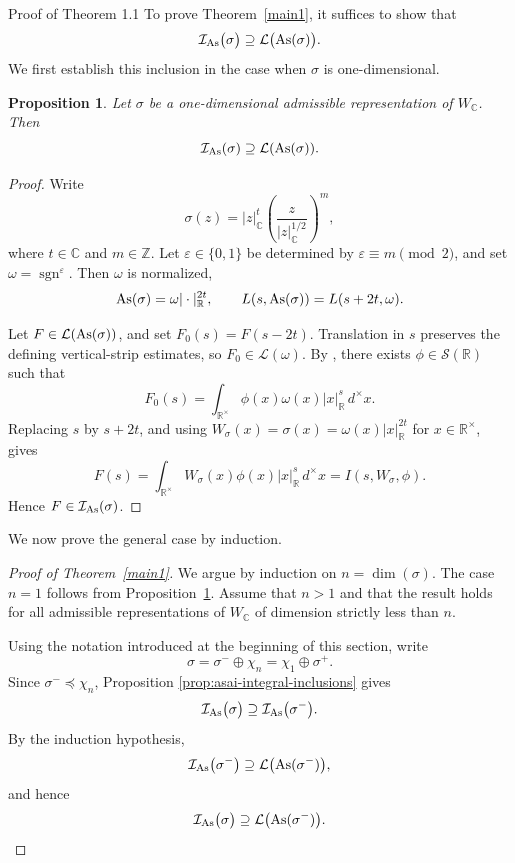 \documentclass[12pt,reqno]{amsart}
\numberwithin{equation}{section}%
\numberwithin{equation}{subsection}
\newtheorem{prop}[equation]{Proposition}
\theoremstyle{definition}
\theoremstyle{remark}
\begin{document}
\begin{section}{Proof of Theorem 1.1}
To prove Theorem~\ref{main1}, it suffices to show that
\[
\mathcal{I}_{\rm As}\bigl(\sigma\bigr)
\supseteq
\mathcal{L}\bigl({\rm As}(\sigma)\bigr).
\]
We first establish this inclusion in the case when $\sigma$ is one-dimensional.

\begin{prop}
\label{prop:asai-rank-one}
Let $\sigma$ be a one-dimensional admissible representation of
$W_{\mathbb C}$. Then
\[
\mathcal{I}_{\rm As}(\sigma)
\supseteq
\mathcal{L}({\rm As}(\sigma)).
\]
\end{prop}

\begin{proof}
Write
\[
\sigma(z)
=
|z|_{\mathbb C}^{t}
\left(
\frac{z}{|z|_{\mathbb C}^{1/2}}
\right)^{m},
\] where \(t\in\mathbb C\) and \(m\in\mathbb Z\). Let
\(\varepsilon\in\{0,1\}\) be determined by
\(\varepsilon\equiv m\pmod 2\), and set
\(\omega=\operatorname{sgn}^{\varepsilon}\). Then \(\omega\) is
normalized,
\[
{\rm As}(\sigma)=\omega|\cdot|_{\mathbb R}^{2t},
\qquad
L(s,{\rm As}(\sigma))=L(s+2t,\omega).
\]

Let \(F\in\mathcal{L}({\rm As}(\sigma))\), and set
\(F_0(s)=F(s-2t)\). Translation in \(s\) preserves the defining
vertical-strip estimates, so \(F_0\in\mathcal{L}(\omega)\). By
\cite[Lemma~12.3]{Jac2009}, there exists
\(\phi\in\mathcal{S}(\mathbb R)\) such that
\[
F_0(s)
=
\int_{\mathbb R^\times}
\phi(x)\omega(x)|x|_{\mathbb R}^{s}\,d^\times x.
\]
Replacing \(s\) by \(s+2t\), and using
\(W_\sigma(x)=\sigma(x)=\omega(x)|x|_{\mathbb R}^{2t}\) for
\(x\in\mathbb R^\times\), gives
\[
F(s)
=
\int_{\mathbb R^\times}
W_\sigma(x)\phi(x)|x|_{\mathbb R}^{s}\,d^\times x
=
I(s,W_\sigma,\phi).
\]
Hence \(F\in\mathcal{I}_{{\rm As}}(\sigma)\).
\end{proof}

We now prove the general case by induction.

\begin{proof}[Proof of Theorem~\ref{main1}]
We argue by induction on $n=\dim(\sigma)$. The case $n=1$ follows from
Proposition~\ref{prop:asai-rank-one}. Assume that $n>1$ and that the
result holds for all admissible representations of $W_{\mathbb{C}}$ of
dimension strictly less than $n$.

Using the notation introduced at the beginning of this section, write
\[
\sigma
=
\sigma^-\oplus\chi_n
=
\chi_1\oplus\sigma^+.
\]
Since $\sigma^-\preceq\chi_n$, Proposition
\ref{prop:asai-integral-inclusions} gives
\[
\mathcal{I}_{\rm As}\bigl(\sigma\bigr)
\supseteq
\mathcal{I}_{\rm As}\bigl(\sigma^-\bigr).
\]
By the induction hypothesis,
\[
\mathcal{I}_{\rm As}\bigl(\sigma^-\bigr)
\supseteq
\mathcal{L}\bigl({\rm As}(\sigma^-)\bigr),
\]
and hence
\[
\mathcal{I}_{\rm As}\bigl(\sigma\bigr)
\supseteq
\mathcal{L}\bigl({\rm As}(\sigma^-)\bigr).
\]


\end{proof}
\end{section}
\end{document}
